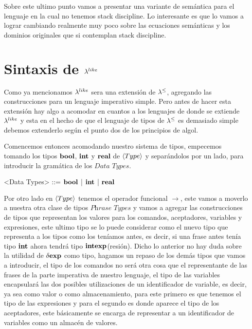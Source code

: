 Sobre este ultimo punto vamos a presentar una variante de sem\'antica para el lenguaje
en la cual no tenemos stack discipline. Lo interesante es que lo vamos a lograr cambiando
realmente muy poco sobre las ecuaciones sem\'anticas y los dominios originales que
si contemplan stack discipline.

\section{Sintaxis de $\lambda^{like}$}

Como ya mencionamos $\lambda^{like}$ sera una extensi\'on de $\lambda^{\leq}$, agregando las
construcciones para un lenguaje imperativo simple. Pero antes de hacer esta extensi\'on
hay algo a acomodar en cuantos a los lenguajes de donde se extiende $\lambda^{like}$ y
esta en el hecho de que el lenguaje de tipos de $\lambda^{\leq}$ es demasiado simple debemos
extenderlo seg\'un el punto dos de los principios de algol.

Comencemos entonces acomodando nuestro sistema de tipos, empecemos tomando los tipos
$\textbf{bool}$, $\textbf{int}$ y $\textbf{real}$ de $\langle Type \rangle$ y separándolos por un lado, para
introducir la gram\'atica de los  $\textit{Data Types}$.

\setlength{\grammarindent}{6em}
\begin{grammar}

<Data Types> ::= $\textbf{bool}$ | $\textbf{int}$ | $\textbf{real}$

\end{grammar}

Por otro lado en $\langle Type \rangle$ tenemos el operador funcional $\rightarrow$, este vamos 
a moverlo a nuestra otra clase de tipos $\textit{Phrase Types}$ y vamos a agregar las
construcciones de tipos que representan los valores para los comandos, aceptadores, variables y 
expresiones, este ultimo tipo se lo puede considerar como el nuevo tipo que 
representa a los tipos como los ten\'iamos antes, es decir, si una frase antes
ten\'ia tipo $\textbf{int}$ ahora tendr\'a tipo $\textbf{int}\textbf{exp}$(resi\'on). Dicho lo
anterior no hay duda sobre la utilidad de $\delta \textbf{exp}$ como tipo, hagamos un repaso
de los dem\'as tipos que vamos a introducir, el tipo de los comandos no ser\'a
otra cosa que el representante de las frases de la parte imperativa de
nuestro lenguaje, el tipo de las variables encapsular\'a las dos posibles utilizaciones
de un identificador de variable, es decir, ya sea como valor o como almacenamiento,
para este primero es que tenemos el tipo de las expresiones y para el segundo es
donde aparece el tipo de los aceptadores, este b\'asicamente se encarga de 
representar a un identificador de variables como un almac\'en de valores.

